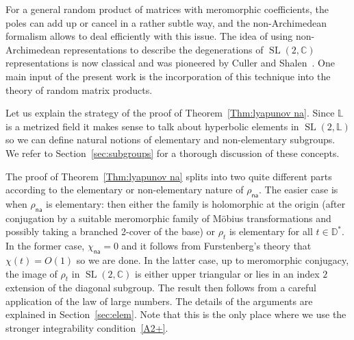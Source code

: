 \documentclass[AHL,Unicode,longabstracts]{cedram}
\DeclareMathOperator{\SL}{SL}
\newcommand{\D}{\mathbb{D}}
\newcommand{\Laurent}{\mathbb{L}}
\newcommand{\na}{\mathsf{na}}
\newcommand{\SLC}{\SL(2,\mathbb C)}
\begin{document}
For a general random product of matrices with meromorphic coefficients, the poles can add up or cancel in a rather subtle way, and the non-Archimedean formalism allows to deal efficiently with this issue. The idea of using non-Archimedean representations to describe the degenerations of $\SLC$ representations is now classical and was pioneered by Culler and Shalen~\cite{culler-shalen}. One main input of the present work is the incorporation of this technique into the theory of random matrix products.

Let us explain the strategy of the proof of Theorem~\ref{Thm:lyapunov na}. Since $\Laurent$ is a metrized field it makes sense to talk about hyperbolic elements in $\SL(2,\Laurent)$ so we can define natural notions of elementary and non-elementary subgroups. We refer to Section~\ref{sec:subgroups} for a thorough discussion of these concepts.

The proof of Theorem~\ref{Thm:lyapunov na} splits into two quite different parts according to the elementary or non-elementary nature of $\rho_\na$. The easier case is when $\rho_\na$ is elementary: then either the family is holomorphic at the origin (after conjugation by a suitable meromorphic family of M\"obius transformations and possibly taking a branched 2-cover of the base) or $\rho_t$ is elementary for all $t\in \D^*$. In the former case, $\chi_\na = 0$ and it follows from Furstenberg's theory that $\chi(t) = O(1)$ so we are done. In the latter case, up to meromorphic conjugacy, the image of $\rho_t$ in $\SLC$ is either upper triangular or lies in an index $2$ extension of the diagonal subgroup. The result then follows from a careful application of the law of large numbers. The details of the arguments are explained in Section~\ref{sec:elem}. Note that this is the only place where we use the stronger integrability condition~\eqref{A2+}.

\end{document}
